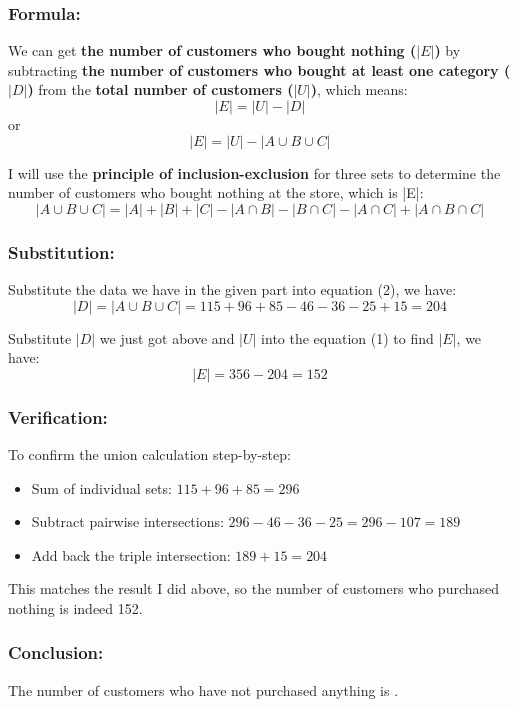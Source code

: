 \documentclass[12pt, a4paper, twoside]{report} %
\begin{document}
\subsubsection*{Formula:}
  We can get \textbf{the number of customers who bought nothing ($|E|$)} by subtracting \textbf{the number of customers who bought at least one category ($|D|$)} from the \textbf{total number of customers ($|U|$)}, which means:
  \[
  |E| = |U| - |D|
  \]
  or 
  \[
  |E| = |U| - |A \cup B \cup C| \tag{1}
  \]

  I will use the \textbf{principle of inclusion-exclusion} for three sets to determine the number of customers who bought nothing at the store, which is |E|:
    \[
    |A \cup B \cup C| = |A| + |B|+|C| - |A \cap B| - |B \cap C| - |A \cap C| + |A \cap B \cap C| \tag{2}
    \]

\subsubsection*{Substitution:}
  Substitute the data we have in the given part into equation (2), we have:
  \[
  |D| = |A \cup B \cup C| = 115 + 96 + 85 - 46 - 36 - 25 + 15 = 204
  \]

  Substitute $|D|$ we just got above and $|U|$ into the equation (1) to find $|E|$, we have:
  \[
  |E| = 356 - 204 = 152
  \]



\subsubsection*{Verification:}
To confirm the union calculation step-by-step:
\begin{itemize}
  \item Sum of individual sets: $115 + 96 + 85 = 296$
  \item Subtract pairwise intersections: $296 - 46 - 36 - 25 = 296 - 107 = 189$
  \item Add back the triple intersection: $189 + 15 = 204$

\end{itemize}
This matches the result I did above, so the number of customers who purchased nothing is indeed 152.


\subsubsection*{Conclusion:}
The number of customers who have not purchased anything is .
\end{document}
